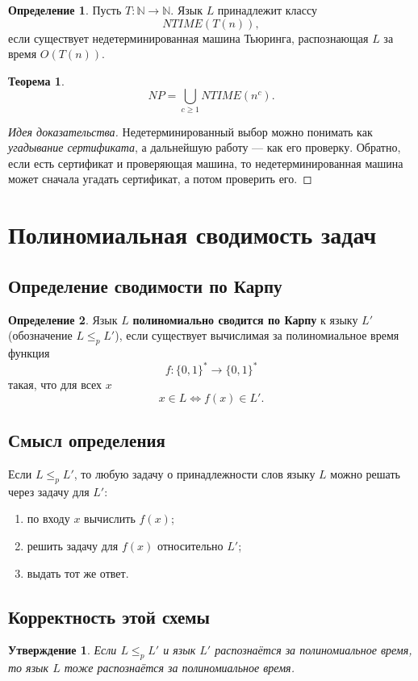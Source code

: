 \documentclass[12pt,a4paper]{article}
\theoremstyle{definition}
\newtheorem{definition}{Определение}[section]
\theoremstyle{plain}
\newtheorem{theorem}{Теорема}[section]
\newtheorem{proposition}{Утверждение}[section]
\begin{document}
\begin{definition}
Пусть $T:\mathbb N\to\mathbb N$. Язык $L$ принадлежит классу
\[
NTIME(T(n)),
\]
если существует недетерминированная машина Тьюринга, распознающая $L$ за время $O(T(n))$.
\end{definition}

\begin{theorem}
\[
NP=\bigcup_{c\ge 1} NTIME(n^c).
\]
\end{theorem}

\begin{proof}[Идея доказательства]
Недетерминированный выбор можно понимать как \emph{угадывание сертификата}, а дальнейшую работу --- как его проверку. Обратно, если есть сертификат и проверяющая машина, то недетерминированная машина может сначала угадать сертификат, а потом проверить его.
\end{proof}

\section{Полиномиальная сводимость задач}

\subsection{Определение сводимости по Карпу}
\begin{definition}
Язык $L$ \textbf{полиномиально сводится по Карпу} к языку $L'$ (обозначение $L\le_p L'$), если существует вычислимая за полиномиальное время функция
\[
f:\{0,1\}^*\to\{0,1\}^*
\]
такая, что для всех $x$
\[
x\in L \iff f(x)\in L'.
\]
\end{definition}

\subsection{Смысл определения}
Если $L\le_p L'$, то любую задачу о принадлежности слов языку $L$ можно решать через задачу для $L'$:
\begin{enumerate}
\item по входу $x$ вычислить $f(x)$;
\item решить задачу для $f(x)$ относительно $L'$;
\item выдать тот же ответ.
\end{enumerate}

\subsection{Корректность этой схемы}
\begin{proposition}
Если $L\le_p L'$ и язык $L'$ распознаётся за полиномиальное время, то язык $L$ тоже распознаётся за полиномиальное время.
\end{proposition}
\end{document}
